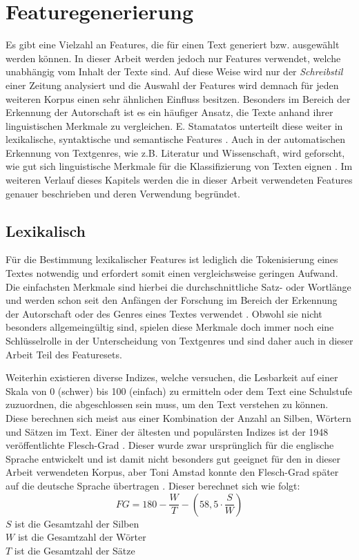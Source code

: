 \section{Featuregenerierung}\label{features}
Es gibt eine Vielzahl an Features, die für einen Text generiert bzw. ausgewählt werden können. In dieser Arbeit werden jedoch nur Features verwendet, welche unabhängig vom Inhalt der Texte sind. Auf diese Weise wird nur der \emph{Schreibstil} einer Zeitung analysiert und die Auswahl der Features wird demnach für jeden weiteren Korpus einen sehr ähnlichen Einfluss besitzen. Besonders im Bereich der Erkennung der Autorschaft ist es ein häufiger Ansatz, die Texte anhand ihrer linguistischen Merkmale zu vergleichen. E. Stamatatos unterteilt diese weiter in lexikalische, syntaktische und semantische Features \cite{stamatatos2009survey}. Auch in der automatischen Erkennung von Textgenres, wie z.B. Literatur und Wissenschaft, wird geforscht, wie gut sich linguistische Merkmale für die Klassifizierung von Texten eignen \cite{cimino2017identifying}. Im weiteren Verlauf dieses Kapitels werden die in dieser Arbeit verwendeten Features genauer beschrieben und deren Verwendung begründet.

\subsection{Lexikalisch}
Für die Bestimmung lexikalischer Features ist lediglich die Tokenisierung eines Textes notwendig und erfordert somit einen vergleichsweise geringen Aufwand. Die einfachsten Merkmale sind hierbei die durchschnittliche Satz- oder Wortlänge und werden schon seit den Anfängen der Forschung im Bereich der Erkennung der Autorschaft oder des Genres eines Textes verwendet \cite[S.~473]{stamatatos2000automatic}. Obwohl sie nicht besonders allgemeingültig sind, spielen diese Merkmale doch immer noch eine Schlüsselrolle in der Unterscheidung von Textgenres \cite{cimino2017identifying} und sind daher auch in dieser Arbeit Teil des Featuresets.

Weiterhin existieren diverse Indizes, welche versuchen, die Lesbarkeit auf einer Skala von 0 (schwer) bis 100 (einfach) zu ermitteln oder dem Text eine Schulstufe zuzuordnen, die abgeschlossen sein muss, um den Text verstehen zu können. Diese berechnen sich meist aus einer Kombination der Anzahl an Silben, Wörtern und Sätzen im Text. Einer der ältesten und populärsten Indizes ist der 1948 veröffentlichte Flesch-Grad \cite{mccallum1982computer}. Dieser wurde zwar ursprünglich für die englische Sprache entwickelt und ist damit nicht besonders gut geeignet für den in dieser Arbeit verwendeten Korpus, aber Toni Amstad konnte den Flesch-Grad später auf die deutsche Sprache übertragen \cite[K.~9]{rottensteiner2010structure}. Dieser berechnet sich wie folgt:
\[ FG = 180 - \frac{W}{T} - (58,5 \cdot \frac{S}{W}) \]
$ S $ ist die Gesamtzahl der Silben\\
$ W $ ist die Gesamtzahl der Wörter\\
$ T $ ist die Gesamtzahl der Sätze

